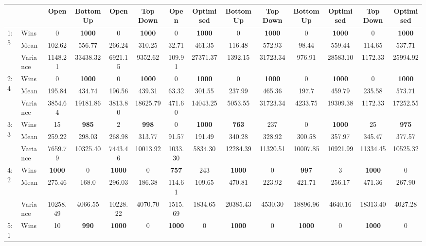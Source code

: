 \begin{table}[H]
\begin{adjustbox}{max width = \textwidth}
\begin{tabular}{ll||cc|cc|cc|cc|cc|cc}
 &  & Open & Bottom Up & Open & Top Down & Open & Optimised & Bottom Up & Top Down & Bottom Up & Optimised & Top Down & Optimised \\ \hline \hline
\multirow{3}{*}{1:5} & Wins & 0 & \textbf{1000} & 0 & \textbf{1000} & 0 & \textbf{1000} & 0 & \textbf{1000} & 0 & \textbf{1000} & 0 & \textbf{1000} \\
 & Mean & 102.62 & 556.77 & 266.24 & 310.25 & 32.71 & 461.35 & 116.48 & 572.93 & 98.44 & 559.44 & 114.65 & 537.71 \\
 & Variance & 1148.21 & 33438.32 & 6921.15 & 9352.62 & 109.91 & 27371.37 & 1392.15 & 31723.34 & 976.91 & 28583.10 & 1172.33 & 25994.92 \\ \hline
\multirow{3}{*}{2:4} & Wins & 0 & \textbf{1000} & 0 & \textbf{1000} & 0 & \textbf{1000} & 0 & \textbf{1000} & 0 & \textbf{1000} & 0 & \textbf{1000} \\
 & Mean & 195.84 & 434.74 & 196.56 & 439.31 & 63.32 & 301.55 & 237.99 & 465.36 & 197.7 & 459.79 & 235.58 & 573.71 \\
 & Variance & 3854.64 & 19181.86 & 3813.80 & 18625.79 & 471.60 & 14043.25 & 5053.55 & 31723.34 & 4233.75 & 19309.38 & 1172.33 & 17252.55 \\ \hline
\multirow{3}{*}{3:3} & Wins & 15 & \textbf{985} & 2 & \textbf{998} & 0 & \textbf{1000} & \textbf{763} & 237 & 0 & \textbf{1000} & 25 & \textbf{975} \\
 & Mean & 259.22 & 298.03 & 268.98 & 313.77 & 91.57 & 191.49 & 340.28 & 328.92 & 300.58 & 357.97 & 345.47 & 377.57 \\
 & Variance & 7659.79 & 10325.40 & 7443.46 & 10013.92 & 1033.30 & 5834.30 & 12284.39 & 11320.51 & 10007.85 & 10921.99 & 11334.45 & 10525.32 \\ \hline
\multirow{3}{*}{4:2} & Wins & \textbf{1000} & 0 & \textbf{1000} & 0 & \textbf{757} & 243 & \textbf{1000} & 0 & \textbf{997} & 3 & \textbf{1000} & 0 \\
 & Mean & 275.46 & 168.0 & 296.03 & 186.38 & 114.61 & 109.65 & 470.81 & 223.92 & 421.71 & 256.17 & 471.36 & 267.90 \\
 & Variance & 10258.49 & 4066.55 & 10228.22 & 4070.70 & 1515.69 & 1834.65 & 20385.43 & 4530.30 & 18896.96 & 4640.16 & 18313.40 & 4027.28 \\ \hline
\multirow{3}{*}{5:1} & Wins & 10 & \textbf{990} & \textbf{1000} & 0 & \textbf{1000} & 0 & \textbf{1000} & 0 & \textbf{1000} & 0 & \textbf{1000} & 0 \\

\end{tabular}
\end{adjustbox}
\end{table}
